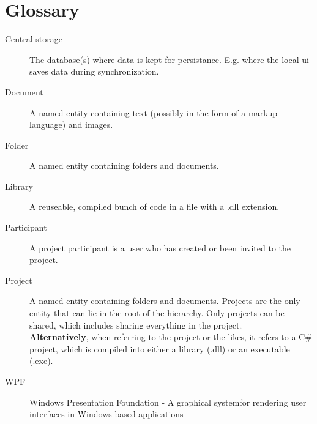 \section{Glossary}
\label{sec:glossary}

\begin{description}

    \item[Central storage] The database(s) where data is kept for persistance. E.g. where the local ui saves data during synchronization.
    \item[Document] A named entity containing text (possibly in the form of a markup-language) and images.
    \item[Folder] A named entity containing folders and documents.
    \item[Library] A reuseable, compiled bunch of code in a file with a .dll extension.
    \item[Participant] A project participant is a user who has created or been invited to the project.
    \item[Project] A named entity containing folders and documents. Projects are the only entity that
        can lie in the root of the hierarchy. Only projects can be shared, which includes sharing
        everything in the project. \\
\textbf{Alternatively}, when referring to the \SOP{} project or the likes, it refers to a C\# project,
        which is compiled into either a library (.dll) or an executable (.exe).
    \item[WPF] Windows Presentation Foundation - A graphical systemfor rendering user interfaces in Windows-based applications

\end{description}
